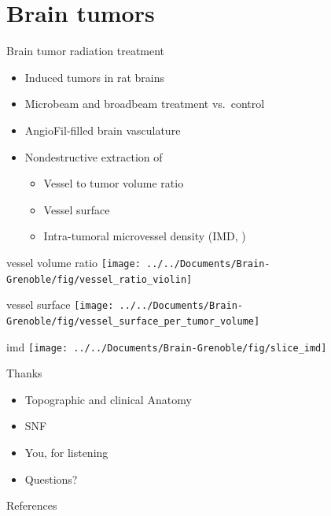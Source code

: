 \documentclass[draft,caption=numbered]{beamer}
\newcommand{\imsize}{\linewidth}
\newcommand{\uaf}{\si{\micro}AngioFil\xspace}
\begin{document}
\section{Brain tumors}
\begin{frame}{Brain tumor radiation treatment}
    \begin{itemize}
        \item Induced tumors in rat brains
        \item Microbeam and broadbeam treatment vs.\ control
        \item \uaf-filled brain vasculature
        \item Nondestructive extraction of
        \begin{itemize}
            \item Vessel to tumor volume ratio
            \item Vessel surface
            \item Intra-tumoral microvessel density (IMD, \cite{Hasan2002})
        \end{itemize}
    \end{itemize}
\end{frame}

\renewcommand{\imsize}{0.9\linewidth}	
\begin{frame}{vessel volume ratio}
    \texttt{[image: ../../Documents/Brain-Grenoble/fig/vessel\_ratio\_violin]}
\end{frame}

\begin{frame}{vessel surface}
    \texttt{[image: ../../Documents/Brain-Grenoble/fig/vessel\_surface\_per\_tumor\_volume]}
\end{frame}

\begin{frame}{imd}
    \texttt{[image: ../../Documents/Brain-Grenoble/fig/slice\_imd]}
\end{frame}

\begin{frame}{Thanks}
	\begin{itemize}
		\item Topographic and clinical Anatomy
		\item SNF
		\pause
		\item You, for listening
		\pause
		\item Questions?
	\end{itemize}
\end{frame}

\begin{frame}{References}
    \renewcommand*{\bibfont}{\tiny}
    \printbibliography
\end{frame}
\end{document}
